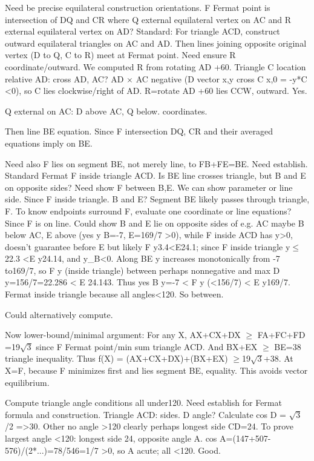 \begin{decodedreasoningpanel}
Need be precise equilateral construction orientations. F Fermat point is intersection of DQ and CR where Q external equilateral vertex on AC and R external equilateral vertex on AD? Standard: For triangle ACD, construct outward equilateral triangles on AC and AD. Then lines joining opposite original vertex (D to Q, C to R) meet at Fermat point. Need ensure R coordinate/outward. We computed R from rotating AD +60. Triangle C location relative AD: cross AD, AC? AD \ensuremath{\times} AC negative (D vector x,y cross C x,0 = -y*C \textless{}0), so C lies clockwise/right of AD. R=rotate AD +60 lies CCW, outward. Yes.

Q external on AC: D above AC, Q below. coordinates.

Then line BE equation. Since F intersection DQ, CR and their averaged equations imply on BE.

Need also F lies on segment BE, not merely line, to FB+FE=BE. Need establish. Standard Fermat F inside triangle ACD. Is BE line crosses triangle, but B and E on opposite sides? Need show F between B,E. We can show parameter or line side. Since F inside triangle. B and E? Segment BE likely passes through triangle, F. To know endpoints surround F, evaluate one coordinate or line equations? Since F is on line. Could show B and E lie on opposite sides of e.g. AC maybe B below AC, E above (yes y B=-7, E=169/7 \textgreater{}0), while F inside ACD has y\textgreater{}0, doesn't guarantee before E but likely F y3.4\textless{}E24.1; since F inside triangle y\ensuremath{\leq}22.3 \textless{}E y24.14, and y\_B\textless{}0. Along BE y increases monotonically from -7 to169/7, so F y (inside
  triangle) between perhaps nonnegative and max D y=156/7=22.286 \textless{} E 24.143. Thus yes B y=-7 \textless{} F y (\textless{}156/7) \textless{} E y169/7. Fermat inside triangle because all angles\textless{}120. So between.

Could alternatively compute.

Now lower-bound/minimal argument:
For any X,
AX+CX+DX \ensuremath{\geq} FA+FC+FD =19\ensuremath{\sqrt{3}} since F Fermat point/min sum triangle ACD.
And BX+EX \ensuremath{\geq} BE=38 triangle inequality.
Thus f(X) = (AX+CX+DX)+(BX+EX) \ensuremath{\geq}19\ensuremath{\sqrt{3}}+38.
At X=F, because F minimizes first and lies segment BE, equality. This avoids vector equilibrium.

Compute triangle angle conditions all under120. Need establish for Fermat formula and construction. Triangle ACD: sides. D angle? Calculate cos D = \ensuremath{\sqrt{3}}/2 =\textgreater{}30. Other no angle \textgreater{}120 clearly perhaps longest side CD=24. To prove largest angle \textless{}120: longest side 24, opposite angle A. cos A=(147+507-576)/(2*...)=78/546=1/7 \textgreater{}0, so A acute; all \textless{}120. Good.


\end{decodedreasoningpanel}
